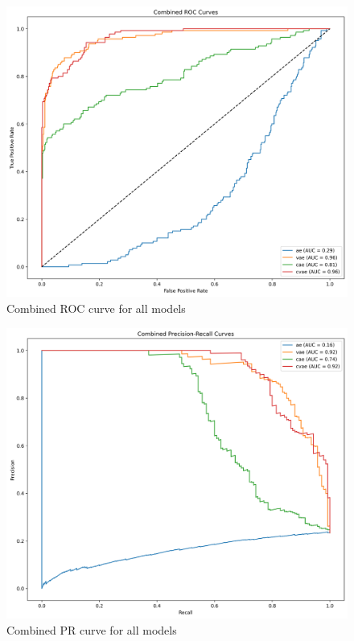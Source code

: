 \begin{figure}[!h]
    \centering
    \includegraphics[scale=0.6]{figures/anomalies/combined_roc_curve.png}
    \caption{Combined ROC curve for all models}
    \label{fig:roccurve}
\end{figure}

\begin{figure}[!h]
    \centering
    \includegraphics[scale=0.6]{figures/anomalies/combined_pr_curve.png}
    \caption{Combined PR curve for all models}
    \label{fig:prcurve}
\end{figure}



